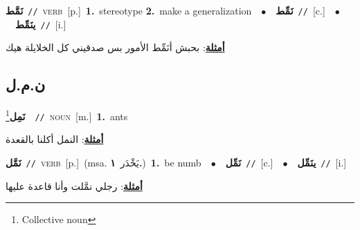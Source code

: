 \documentclass[10pt,a4paper,twoside]{article} %
\begin{document}
\begin{multicols}{2}
{\setlength\topsep{0pt}\textbf{\foreignlanguage{arabic}{نَمَّط}}\ {\color{gray}\texttt{//}\color{black}}\ \textsc{verb}\ [p.]\ \textbf{1.}~stereotype  \textbf{2.}~make a generalization\ \ $\bullet$\ \ \setlength\topsep{0pt}\textbf{\foreignlanguage{arabic}{نَمِّط}}\ {\color{gray}\texttt{//}\color{black}}\ [c.]\ \ $\bullet$\ \ \setlength\topsep{0pt}\textbf{\foreignlanguage{arabic}{ينَمِّط}}\ {\color{gray}\texttt{//}\color{black}}\ [i.]\  \begin{flushright}\color{gray}\foreignlanguage{arabic}{\textbf{\underline{\foreignlanguage{arabic}{أمثلة}}}: بحبش أنَمِّط الأمور بس صدقيني كل الخلايلة هيك}\end{flushright}\color{black}} \vspace{2mm}

\vspace{-3mm}
\subsection*{\color{blue}\foreignlanguage{arabic}{ن.م.ل}\color{blue}{}} 

{\setlength\topsep{0pt}\textbf{\foreignlanguage{arabic}{نَمِل}}\footnote{Collective noun}\ \ {\color{gray}\texttt{//}\color{black}}\ \textsc{noun}\ [m.]\ \textbf{1.}~ants\  \begin{flushright}\color{gray}\foreignlanguage{arabic}{\textbf{\underline{\foreignlanguage{arabic}{أمثلة}}}: النمل أكلنا بالقعدة}\end{flushright}\color{black}} \vspace{2mm}

{\setlength\topsep{0pt}\textbf{\foreignlanguage{arabic}{نَمَّل}}\ {\color{gray}\texttt{//}\color{black}}\ \textsc{verb}\ [p.]\ \color{gray}(msa. \foreignlanguage{arabic}{يَخْدَر}~\foreignlanguage{arabic}{\textbf{١.}})\color{black}\ \textbf{1.}~be numb\ \ $\bullet$\ \ \setlength\topsep{0pt}\textbf{\foreignlanguage{arabic}{نَمِّل}}\ {\color{gray}\texttt{//}\color{black}}\ [c.]\ \ $\bullet$\ \ \setlength\topsep{0pt}\textbf{\foreignlanguage{arabic}{ينَمِّل}}\ {\color{gray}\texttt{//}\color{black}}\ [i.]\  \begin{flushright}\color{gray}\foreignlanguage{arabic}{\textbf{\underline{\foreignlanguage{arabic}{أمثلة}}}: رجلي نمَّلت وأنا قاعدة عليها}\end{flushright}\color{black}} \vspace{2mm}


\end{multicols}
\end{document}

